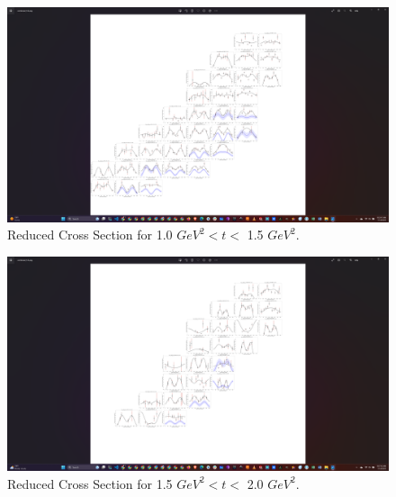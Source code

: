 \begin{figure}[ht]
    \centering
    \includegraphics[trim={14.8cm 4cm 18.5cm 4cm},clip,width=\textwidth]{Chapters/Ch4-BaseAnalysis/bin_by_bin_cross_sections/pics_screenshots/t_10.png}
    \caption[Reduced Cross Section for 1.0 $GeV^2 < t <$ 1.5 $GeV^2$]{Reduced Cross Section for 1.0 $GeV^2 < t <$ 1.5 $GeV^2$.}
    \label{fig:combined_t1.0}
\end{figure}

\begin{figure}[ht]
    \centering
    \includegraphics[trim={18.8cm 4cm 18.5cm 4cm},clip,width=\textwidth]{Chapters/Ch4-BaseAnalysis/bin_by_bin_cross_sections/pics_screenshots/t15.png}
    \caption[Reduced Cross Section for 1.5 $GeV^2 < t <$ 2.0 $GeV^2$]{Reduced Cross Section for 1.5 $GeV^2 < t <$ 2.0 $GeV^2$.}
    \label{fig:combined_t1.5}
\end{figure}

\fi